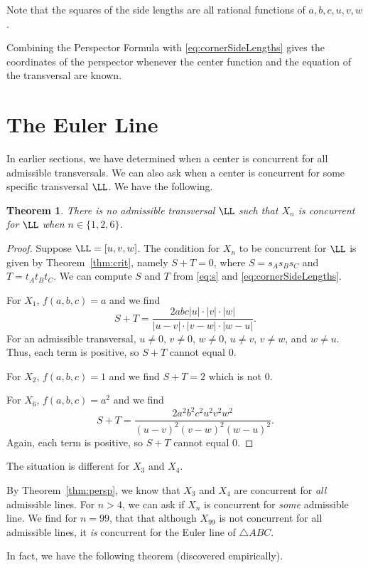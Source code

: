 \documentclass[12pt,a4paper]{amsart}
\newtheorem{theorem}{Theorem} [section]
\theoremstyle{remark}
\begin{document}
Note that the squares of the side lengths are all rational functions of $a,b,c,u,v,w$.

Combining the Perspector Formula with \eqref{eq:cornerSideLengths} gives the
coordinates of the perspector whenever the center function and the equation of
the transversal are known.

\section{The Euler Line}

In earlier sections, we have determined when a center is concurrent for all admissible transversals.
We can also ask when a center is concurrent for some specific transversal $\LL$. We have the following.

\begin{theorem}
There is no admissible transversal $\LL$ such that $X_n$ is concurrent for $\LL$
when $n\in\{1,2,6\}$. 
\end{theorem}

\begin{proof}
Suppose $\LL=[u,v,w]$.
The condition for $X_n$ to be concurrent for $\LL$ is given by Theorem~\ref{thm:crit},
namely $S+T=0$, where $S=s_As_Bs_C$ and $T=t_At_Bt_C$.
We can compute $S$ and $T$ from \eqref{eq:s} and \eqref{eq:cornerSideLengths}.

For $X_1$, $f(a,b,c)=a$ and we find
$$S+T=\frac{2abc|u|\cdot|v|\cdot|w|}{|u-v|\cdot|v-w|\cdot|w-u|}.$$
For an admissible transversal, $u\neq 0$, $v\neq 0$, $w\neq 0$, $u\neq v$, $v\neq w$, and $w\neq u$.
Thus, each term is positive, so $S+T$ cannot equal 0.

For $X_2$, $f(a,b,c)=1$ and we find
$S+T=2$ which is not 0.

For $X_6$, $f(a,b,c)=a^2$ and we find
$$S+T=\frac{2a^2b^2c^2u^2v^2w^2}{(u-v)^2(v-w)^2(w-u)^2}.$$
Again, each term is positive, so $S+T$ cannot equal 0.
\end{proof}

The situation is different for $X_3$ and $X_4$.

By Theorem~\ref{thm:persp}, we know that $X_3$ and $X_4$ are concurrent for \emph{all} admissible lines.
For $n>4$, we can ask if $X_n$ is concurrent for \emph{some} admissible line.
We find for $n=99$, that that although $X_{99}$ is not concurrent for all admissible lines,
it \emph{is} concurrent for the Euler line of $\triangle ABC$.

In fact, we have the following theorem (discovered empirically).
\end{document}
